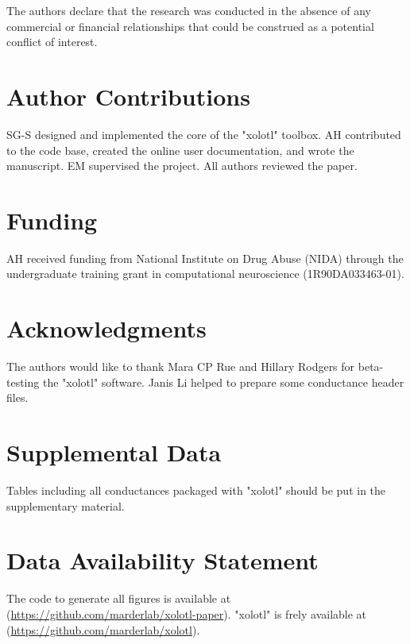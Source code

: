 \documentclass{frontiersSCNS} %
\begin{document}
The authors declare that the research was conducted in the absence of any commercial or financial relationships that could be construed as a potential conflict of interest.

\section*{Author Contributions}

SG-S designed and implemented the core of the "xolotl" toolbox. AH contributed to the code base, created the online user documentation, and wrote the manuscript. EM supervised the project. All authors reviewed the paper.

\section*{Funding}

AH received funding from National Institute on Drug Abuse (NIDA) through the undergraduate training grant in computational neuroscience (1R90DA033463-01).

\section*{Acknowledgments}
The authors would like to thank Mara CP Rue and Hillary Rodgers for beta-testing the "xolotl" software. Janis Li helped to prepare some conductance header files.

\section*{Supplemental Data}
Tables including all conductances packaged with "xolotl" should be put in the supplementary material.

\section*{Data Availability Statement}

The code to generate all figures is available at (\url{https://github.com/marderlab/xolotl-paper}). "xolotl" is frely available at (\url{https://github.com/marderlab/xolotl}).

%
%
%
%
%
%

\printbibliography
\end{document}
